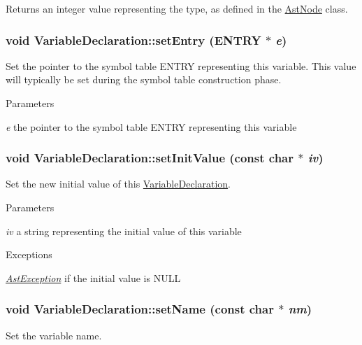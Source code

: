 \begin{DoxyReturn}{Returns}
an integer value representing the type, as defined in the \hyperlink{classAstNode}{AstNode} class. 
\end{DoxyReturn}
\hypertarget{classVariableDeclaration_a42cfc2417b553b93190b937d7413a32c}{
\subsubsection[{setEntry}]{\setlength{\rightskip}{0pt plus 5cm}void VariableDeclaration::setEntry (ENTRY $\ast$ {\em e})}}
\label{classVariableDeclaration_a42cfc2417b553b93190b937d7413a32c}
Set the pointer to the symbol table ENTRY representing this variable. This value will typically be set during the symbol table construction phase.


\begin{DoxyParams}{Parameters}
\item[{\em e}]the pointer to the symbol table ENTRY representing this variable \end{DoxyParams}
\hypertarget{classVariableDeclaration_a4bdb316526fd2c35221c6b65aa667bc7}{
\subsubsection[{setInitValue}]{\setlength{\rightskip}{0pt plus 5cm}void VariableDeclaration::setInitValue (const char $\ast$ {\em iv})}}
\label{classVariableDeclaration_a4bdb316526fd2c35221c6b65aa667bc7}
Set the new initial value of this \hyperlink{classVariableDeclaration}{VariableDeclaration}.


\begin{DoxyParams}{Parameters}
\item[{\em iv}]a string representing the initial value of this variable \end{DoxyParams}

\begin{DoxyExceptions}{Exceptions}
\item[{\em \hyperlink{classAstException}{AstException}}]if the initial value is NULL \end{DoxyExceptions}
\hypertarget{classVariableDeclaration_a87d34512598049ef3f1d945451873ab5}{
\subsubsection[{setName}]{\setlength{\rightskip}{0pt plus 5cm}void VariableDeclaration::setName (const char $\ast$ {\em nm})}}
\label{classVariableDeclaration_a87d34512598049ef3f1d945451873ab5}
Set the variable name.


